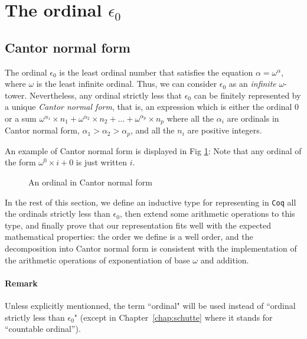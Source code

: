 \section{The ordinal \texorpdfstring{\(\epsilon_0\)}{epsilon0}}
\label{sec:epsilon0-intro}

\subsection{Cantor normal form}

The ordinal \(\epsilon_0\) is the least ordinal number that satisfies 
the equation \(\alpha = \omega^\alpha\), where \(\omega\) is 
the least infinite ordinal. Thus, we can consider \(\epsilon_0\) as an
\emph{infinite} \(\omega\)-tower.
Nevertheless, 
any ordinal strictly less that \(\epsilon_0\) 
can be finitely represented by a unique  \emph{Cantor normal form}, 
that is, an expression  which is either  the ordinal \(0\) or 
a sum  \(\omega^{\alpha_1} \times n_1 + \omega^{\alpha_2} \times n_2 + 
  \dots + \omega^{\alpha_p} \times n_p\) where all the \(\alpha_i\) 
are ordinals in Cantor  normal form, \(\alpha_1 > \alpha_2 > \alpha_p\), 
and all the \(n_i\) are positive integers.

An example of Cantor normal form is displayed in Fig \ref{fig:cnf-example}:
Note that  any ordinal of
the form \(\omega^0 \times i + 0\) is just written \(i\).

\begin{figure}[htb]
\centering
{}
\caption{\label{fig:cnf-example}
An ordinal in Cantor normal form}
\end{figure}




In the rest of this section, we define an inductive type for representing in \texttt{Coq}
all the ordinals strictly  less than  \(\epsilon_0\), then extend some arithmetic operations
to this type, and finally prove that our representation fits well with 
the expected mathematical properties: the order we define is a well order, 
and the decomposition into Cantor normal form  is consistent 
with the implementation of the arithmetic operations of exponentiation of base \(\omega\) 
and addition.

\paragraph*{Remark}
\label{sec:orgheadline65}
Unless explicitly mentionned, the term ``ordinal" will be used instead of
``ordinal strictly less than \(\epsilon_0\)" (except in Chapter~\ref{chap:schutte} where it stands for ``countable ordinal'').



